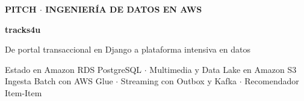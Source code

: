 \documentclass[aspectratio=169,11pt]{beamer}
\newcommand{\kick}[1]{{\color{accent}\footnotesize\bfseries\MakeUppercase{#1}}\par}
\begin{document}
\begin{frame}[plain]
  \vfill
  \kick{Pitch $\cdot$ Ingeniería de Datos en AWS}
  \vspace{0.3em}
  {\color{ink}\fontsize{40}{44}\selectfont\bfseries tracks4u}\par
  \vspace{0.3em}
  {\color{muted}\Large De portal transaccional en Django a plataforma intensiva en datos}\par
  \vspace{0.6em}{\color{accent}\rule{3cm}{2.5pt}}\par
  \vspace{0.6em}
  {\color{ink}\normalsize Estado en Amazon RDS PostgreSQL $\cdot$ Multimedia y Data Lake en Amazon S3\\
  Ingesta Batch con AWS Glue $\cdot$ Streaming con Outbox y Kafka $\cdot$ Recomendador Item-Item}
  \vfill
\end{frame}

\end{document}
